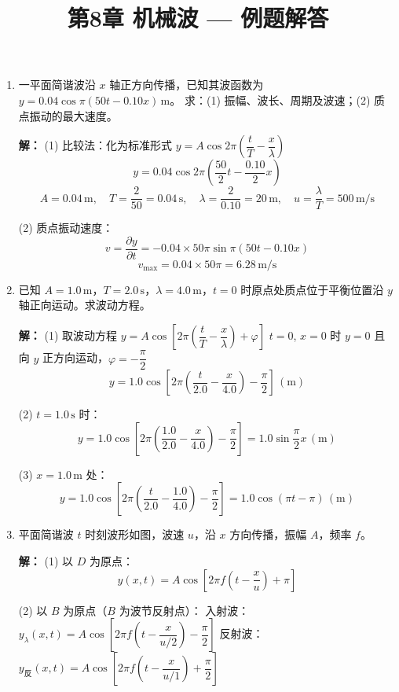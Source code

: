 \documentclass{ctexart}
\title{\textbf{第8章 机械波} --- 例题解答}
\author{}
\date{}
\begin{document}
\maketitle

\begin{enumerate}

\item 一平面简谐波沿 $x$ 轴正方向传播，已知其波函数为 $y = 0.04\cos\pi(50t - 0.10x)\,\text{m}$。
求：(1) 振幅、波长、周期及波速；(2) 质点振动的最大速度。

\textbf{解：}
(1) 比较法：化为标准形式 $y = A\cos2\pi\left(\dfrac{t}{T} - \dfrac{x}{\lambda}\right)$
\[
y = 0.04\cos2\pi\left(\frac{50}{2}t - \frac{0.10}{2}x\right)
\]
\[
A = 0.04\,\text{m},\quad T = \frac{2}{50} = 0.04\,\text{s},\quad
\lambda = \frac{2}{0.10} = 20\,\text{m},\quad u = \frac{\lambda}{T} = 500\,\text{m/s}
\]

(2) 质点振动速度：
\[
v = \frac{\partial y}{\partial t} = -0.04 \times 50\pi\sin\pi(50t - 0.10x)
\]
\[
v_{\max} = 0.04 \times 50\pi = 6.28\,\text{m/s}
\]

\item 已知 $A = 1.0\,\text{m}$，$T = 2.0\,\text{s}$，$\lambda = 4.0\,\text{m}$，$t = 0$ 时原点处质点位于平衡位置沿 $y$ 轴正向运动。求波动方程。

\textbf{解：}
(1) 取波动方程 $y = A\cos\left[2\pi\left(\dfrac{t}{T} - \dfrac{x}{\lambda}\right) + \varphi\right]$
$t = 0$, $x = 0$ 时 $y = 0$ 且向 $y$ 正方向运动，$\varphi = -\dfrac{\pi}{2}$
\[
y = 1.0\cos\left[2\pi\left(\frac{t}{2.0} - \frac{x}{4.0}\right) - \frac{\pi}{2}\right]\,(\text{m})
\]

(2) $t = 1.0\,\text{s}$ 时：
\[
y = 1.0\cos\left[2\pi\left(\frac{1.0}{2.0} - \frac{x}{4.0}\right) - \frac{\pi}{2}\right]
= 1.0\sin\frac{\pi}{2}x\,(\text{m})
\]

(3) $x = 1.0\,\text{m}$ 处：
\[
y = 1.0\cos\left[2\pi\left(\frac{t}{2.0} - \frac{1.0}{4.0}\right) - \frac{\pi}{2}\right]
= 1.0\cos\left(\pi t - \pi\right)\,(\text{m})
\]

\item 平面简谐波 $t$ 时刻波形如图，波速 $u$，沿 $x$ 方向传播，振幅 $A$，频率 $f$。

\textbf{解：}
(1) 以 $D$ 为原点：
\[
y(x,t) = A\cos\left[2\pi f\left(t - \frac{x}{u}\right) + \pi\right]
\]

(2) 以 $B$ 为原点（$B$ 为波节反射点）：
入射波：$y_{\lambda}(x,t) = A\cos\left[2\pi f\left(t - \dfrac{x}{u/2}\right) - \dfrac{\pi}{2}\right]$
反射波：$y_{\text{反}}(x,t) = A\cos\left[2\pi f\left(t - \dfrac{x}{u/1}\right) + \dfrac{\pi}{2}\right]$


\end{enumerate}
\end{document}
